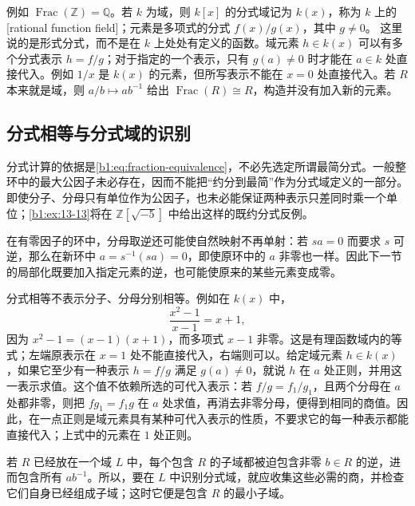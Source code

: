 \ProseParagraphBreak
例如 \(\operatorname{Frac}(\mathbb Z)=\mathbb Q\)。若 \(k\) 为域，则 \(k[x]\) 的分式域记为 \(k(x)\)，称为 \(k\) 上的[rational function field]；元素是多项式的分式 \(f(x)/g(x)\)，其中 \(g\neq0\)。
这里说的是形式分式，而不是在 \(k\) 上处处有定义的函数。域元素 \(h\in k(x)\) 可以有多个分式表示 \(h=f/g\)；对于指定的一个表示，只有 \(g(a)\ne0\) 时才能在 \(a\in k\) 处直接代入。例如 \(1/x\) 是 \(k(x)\) 的元素，但所写表示不能在 \(x=0\) 处直接代入。若 \(R\) 本来就是域，则 \(a/b\mapsto ab^{-1}\) 给出 \(\operatorname{Frac}(R)\cong R\)，构造并没有加入新的元素。

\subsection{分式相等与分式域的识别}
\label{b1:subsec:1301:02}

分式计算的依据是\eqref{b1:eq:fraction-equivalence}，不必先选定所谓最简分式。一般整环中的最大公因子未必存在，因而不能把“约分到最简”作为分式域定义的一部分。即使分子、分母只有单位作为公因子，也未必能保证两种表示只差同时乘一个单位；\cref{b1:ex:13-13}将在 \(\mathbb Z[\sqrt{-5}]\) 中给出这样的既约分式反例。

\ProseParagraphBreak
在有零因子的环中，分母取逆还可能使自然映射不再单射：若 \(sa=0\) 而要求 \(s\) 可逆，那么在新环中 \(a=s^{-1}(sa)=0\)，即使原环中的 \(a\) 非零也一样。因此下一节的局部化既要加入指定元素的逆，也可能使原来的某些元素变成零。

\ProseParagraphBreak
分式相等不表示分子、分母分别相等。例如在 \(k(x)\) 中，
\[
	\frac{x^2-1}{x-1}=x+1,
\]
因为 \(x^2-1=(x-1)(x+1)\)，而多项式 \(x-1\) 非零。这是有理函数域内的等式；左端原表示在 \(x=1\) 处不能直接代入，右端则可以。给定域元素 \(h\in k(x)\)，如果它至少有一种表示 \(h=f/g\) 满足 \(g(a)\ne0\)，就说 \(h\) 在 \(a\) 处正则，并用这一表示求值。这个值不依赖所选的可代入表示：若 \(f/g=f_1/g_1\)，且两个分母在 \(a\) 处都非零，则把 \(fg_1=f_1g\) 在 \(a\) 处求值，再消去非零分母，便得到相同的商值。因此，在一点正则是域元素具有某种可代入表示的性质，不要求它的每一种表示都能直接代入；上式中的元素在 \(1\) 处正则。

\ProseParagraphBreak
若 \(R\) 已经放在一个域 \(L\) 中，每个包含 \(R\) 的子域都被迫包含非零 \(b\in R\) 的逆，进而包含所有 \(ab^{-1}\)。所以，要在 \(L\) 中识别分式域，就应收集这些必需的商，并检查它们自身已经组成子域；这时它便是包含 \(R\) 的最小子域。

